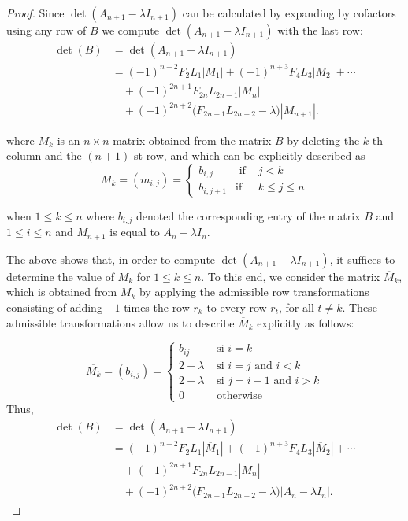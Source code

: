 \documentclass[11pt]{birkjour}
\theoremstyle{definition}
\theoremstyle{remark}
\numberwithin{equation}{section}
\begin{document}
\begin{proof}
\noindent Since $\operatorname{det}\left(A_{n+1}-\lambda I_{n+1}\right)$ can be calculated by expanding by cofactors using any row of $B$ we compute $\operatorname{det}\left(A_{n+1}-\lambda I_{n+1}\right)$ with the last row: 
\begin{align*}
\operatorname{det}(B)
&= \operatorname{det}(A_{n+1}-\lambda I_{n+1}) \\
&= (-1)^{n+2}F_2L_1|M_1|
 + (-1)^{n+3}F_{4}L_{3}|M_2| + \cdots \\
&\quad + (-1)^{2n+1}F_{2n}L_{2n-1}|M_n| \\
&\quad + (-1)^{2n+2}\bigl(F_{2n+1}L_{2n+2}-\lambda\bigr)|M_{n+1}|.
\end{align*}


\noindent where $M_k$ is an $n \times n$ matrix obtained from the matrix $B$ by deleting the $k$-th column and the $(n+1)$-st row, and which can be explicitly described as
$$
M_k=(m_{i,j})=\left\{\begin{array}{lll}
b_{i,j} & \text { if } & j<k \\
b_{i,j+1} & \text {if} & k \leq j \leq n
\end{array}\right.
$$

\noindent when $1\leq k\leq n$ where $b_{i,j}$ denoted the corresponding entry of the matrix $B$ and $1\leq i \leq n$ and $M_{n+1}$ is equal to $A_{n}-\lambda I_n$.

\noindent The above shows that, in order to compute $\operatorname{det}\left(A_{n+1}-\lambda I_{n+1}\right)$, it suffices to determine the value of $M_k$ for $1 \leq k \leq n$. To this end, we consider the matrix $\overline{M}_k$, which is obtained from $M_k$ by applying the admissible row transformations consisting of adding $-1$ times the row $r_k$ to every row $r_t$, for all $t \neq k$. These admissible transformations allow us to describe $\overline{M}_k$ explicitly as follows:

$$
\overline{M_k}=(b_{i,j})= \begin{cases}b_{ij} & \text { si } i=k \\ 
2-\lambda & \text { si } i=j  \text{ and } i<k \\ 
2-\lambda & \text { si } j=i-1 \text { and } i>k \\ 
0 & \text { otherwise }\end{cases}
$$
Thus,
\begin{align*}
\operatorname{det}(B)
&= \operatorname{det}(A_{n+1}-\lambda I_{n+1}) \\
&= (-1)^{n+2}F_2L_1|\overline{M}_1|
 + (-1)^{n+3}F_{4}L_{3}|\overline{M}_2| + \cdots \\
&\quad + (-1)^{2n+1}F_{2n}L_{2n-1}|\overline{M}_n| \\
&\quad + (-1)^{2n+2}\bigl(F_{2n+1}L_{2n+2}-\lambda\bigr)|A_n-\lambda I_n|.
\end{align*}


\end{proof}
\end{document}
